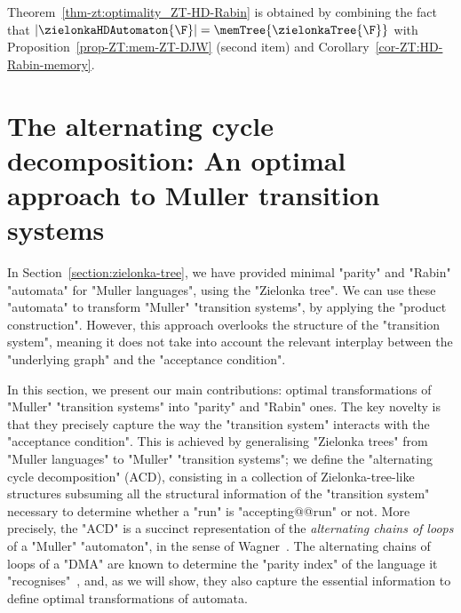 \documentclass{theoretics}
\begin{document}
Theorem~\ref{thm-zt:optimality_ZT-HD-Rabin} is obtained by combining the fact that $|\zielonkaHDAutomaton{\F}| = \memTree{\zielonkaTree{\F}}$ with Proposition~\ref{prop-ZT:mem-ZT-DJW} (second item) and Corollary~\ref{cor-ZT:HD-Rabin-memory}.



 	
	
	\section{The alternating cycle decomposition: An optimal approach to Muller transition systems}\label{section:acd}

In Section~\ref{section:zielonka-tree}, we have provided minimal "parity" and "Rabin" "automata" for "Muller languages", using the "Zielonka tree".
We can use these "automata" to transform "Muller" "transition systems", by applying the "product construction".
However, this approach overlooks the structure of the "transition system", meaning it does not take into account the relevant interplay between the "underlying graph" and the "acceptance condition".

In this section, we present our main contributions: optimal transformations of "Muller" "transition systems" into "parity" and "Rabin" ones.
The key novelty is that they precisely capture the way the "transition system" interacts with the "acceptance condition".
This is achieved by generalising "Zielonka trees" from "Muller languages" to "Muller" "transition systems"; we define the "alternating cycle decomposition" (ACD), consisting in a collection of Zielonka-tree-like structures subsuming all the structural information of the "transition system" necessary to determine whether a "run" is "accepting@@run" or not.
More precisely, the "ACD" is a succinct representation of the \emph{alternating chains of loops} of a "Muller" "automaton", in the sense of Wagner~\cite{Wagner1979omega}. The alternating chains of loops of a "DMA" are known to determine the "parity index" of the language it "recognises"~\cite{Wagner1979omega}, and, as we will show, they also capture the essential information to define optimal transformations of automata.
\end{document}
